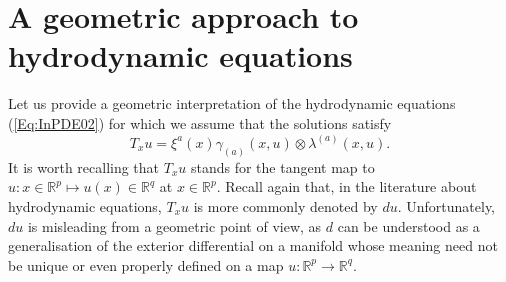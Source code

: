 \documentclass{birkjour}
\theoremstyle{definition}
\theoremstyle{remark}
\numberwithin{equation}{section}
\numberwithin{equation}{section}
\numberwithin{thm}{section}
\numberwithin{equation}{section}
\numberwithin{thm}{section}
\begin{document}


\section{A geometric approach to hydrodynamic equations}\label{Se:GA}


Let us provide a geometric interpretation of the hydrodynamic equations (\ref{Eq:InPDE02}) for which %
we assume that the %
solutions satisfy 
\begin{equation}\label{Eq:FirstTu}
	T_xu=%
	\xi^a(x)\gamma_{(a)}(x,u)\otimes \lambda^{(a)}(x,u).
\end{equation}
It is worth recalling that $T_xu$  stands for the tangent map to $u:x\in \mathbb{R}^p\mapsto u(x)\in \mathbb{R}^q$ at $x\in \mathbb{R}^p$. Recall again that, in the literature about hydrodynamic equations, $T_xu$ is more commonly denoted by $du$. Unfortunately, $du$ is misleading from a geometric point of view, as $d$ can be understood as a generalisation of the exterior differential on a manifold whose meaning need not be unique or even properly defined on a map $u:\mathbb{R}^p\rightarrow \mathbb{R}^q$.
\end{document}
